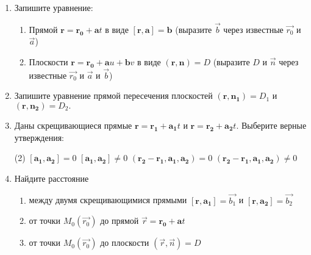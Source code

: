 \begin{enumerate}
	\item Запишите уравнение:
        \begin{enumerate}[topsep=0cm, itemsep=1.5cm, after=\vspace{1.5cm}]
            \item Прямой $\mathbf{r}=\mathbf{r_0}+\mathbf{a}t$ в виде $[\mathbf{r}, \mathbf{a}]=\mathbf{b}$ (выразите $\vec{b}$ через известные $\vec{r_0}$ и $\vec{a}$)
            \item Плоскости $\mathbf{r}=\mathbf{r_0}+\mathbf{a}u + \mathbf{b}v$ в виде $(\mathbf{r}, \mathbf{n})=D$ (выразите $D$ и $\vec{n}$ через известные $\vec{r_0}$ и $\vec{a}$ и $\vec{b}$)
        \end{enumerate}
    \item Запишите уравнение прямой пересечения плоскостей $(\mathbf{r}, \mathbf{n_1})= D_1$ и $(\mathbf{r}, \mathbf{n_2})= D_2.$
       \vspace{1.5cm}
        
    \item Даны скрещивающиеся прямые $\mathbf{r}=\mathbf{r_1}+\mathbf{a_1}t$ и $\mathbf{r}=\mathbf{r_2}+\mathbf{a_2}t$. Выберите верные утверждения:
        \begin{tasks}(2)
            \task $  [\mathbf{a_1}, \mathbf{a_2}] =0$
            \task $ [\mathbf{a_1}, \mathbf{a_2}] \neq 0$
            \task $(\mathbf{r_2}-\mathbf{r_1}, \mathbf{a_1}, \mathbf{a_2})=0$
            \task $(\mathbf{r_2}-\mathbf{r_1}, \mathbf{a_1}, \mathbf{a_2}) \neq 0$
        \end{tasks}
  
    
	\item Найдите расстояние
	    \begin{enumerate}[itemsep=2cm]
	        \item между двумя скрещивающимися прямыми $[\mathbf{r}, \mathbf{a_1}]=\vec{b_1}$ и $[\mathbf{r}, \mathbf{a_2}]=\vec{b_2}$
	        \item от точки $M_0(\vec{r_0})$ до прямой $\vec{r}=\mathbf{r_0}+\mathbf{a}t$
	        \item от точки $M_0(\vec{r_0})$ до плоскости $(\vec{r}, \vec{n}) = D$
	    \end{enumerate}
	    
\end{enumerate}